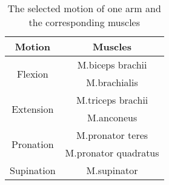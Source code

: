 \begin{table}
	\caption[Muscles involved]{The selected motion of one arm and the corresponding muscles}
	\centering
	\label{tb:3-IMR:motionMuscles}
	\scriptsize
	\begin{center}
		\begin{tabular}{|c|c|}
			\hline
			Motion & Muscles \\
			\hline
			\multirow{2}{*}{Flexion} & M.biceps brachii \\
									 & M.brachialis \\
			\hline
			\multirow{2}{*}{Extension} & M.triceps brachii \\
			& M.anconeus \\
			\hline
			\multirow{2}{*}{Pronation} & M.pronator teres \\
			& M.pronator quadratus \\
			\hline
			Supination &M.supinator \\
			\hline
		\end{tabular}
	\end{center}
\end{table}